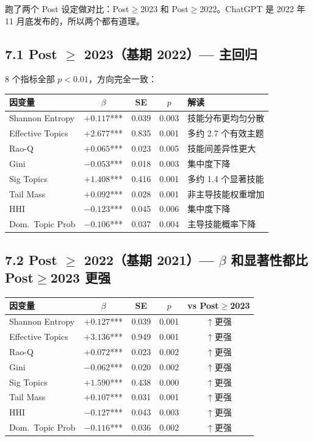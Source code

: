 \documentclass[12pt,a4paper]{article}
\begin{document}
跑了两个 Post 设定做对比：Post$\geq$2023 和 Post$\geq$2022。ChatGPT 是 2022 年 11 月底发布的，所以两个都有道理。

\subsection*{7.1 Post $\geq$ 2023（基期 2022）--- 主回归}

8 个指标全部 $p<0.01$，方向完全一致：

\begin{center}
\small
\begin{tabular}{lcccp{4.5cm}}
\toprule
因变量 & $\beta$ & SE & $p$ & 解读 \\
\midrule
Shannon Entropy & $+0.117$*** & 0.039 & 0.003 & 技能分布更均匀分散 \\
Effective Topics & $+2.677$*** & 0.835 & 0.001 & 多约 2.7 个有效主题 \\
Rao-Q & $+0.065$*** & 0.023 & 0.005 & 技能间差异性更大 \\
Gini & $-0.053$*** & 0.018 & 0.003 & 集中度下降 \\
Sig Topics & $+1.408$*** & 0.416 & 0.001 & 多约 1.4 个显著技能 \\
Tail Mass & $+0.092$*** & 0.028 & 0.001 & 非主导技能权重增加 \\
HHI & $-0.123$*** & 0.045 & 0.006 & 集中度下降 \\
Dom.\ Topic Prob & $-0.106$*** & 0.037 & 0.004 & 主导技能概率下降 \\
\bottomrule
\end{tabular}
\end{center}

\subsection*{7.2 Post $\geq$ 2022（基期 2021）--- $\beta$ 和显著性都比 Post$\geq$2023 更强}

\begin{center}
\small
\begin{tabular}{lcccc}
\toprule
因变量 & $\beta$ & SE & $p$ & vs Post$\geq$2023 \\
\midrule
Shannon Entropy & $+0.127$*** & 0.039 & 0.001 & $\uparrow$更强 \\
Effective Topics & $+3.136$*** & 0.949 & 0.001 & $\uparrow$更强 \\
Rao-Q & $+0.072$*** & 0.023 & 0.002 & $\uparrow$更强 \\
Gini & $-0.062$*** & 0.020 & 0.002 & $\uparrow$更强 \\
Sig Topics & $+1.590$*** & 0.438 & 0.000 & $\uparrow$更强 \\
Tail Mass & $+0.107$*** & 0.031 & 0.001 & $\uparrow$更强 \\
HHI & $-0.127$*** & 0.043 & 0.003 & $\uparrow$更强 \\
Dom.\ Topic Prob & $-0.116$*** & 0.036 & 0.002 & $\uparrow$更强 \\
\bottomrule
\end{tabular}
\end{center}
\end{document}

